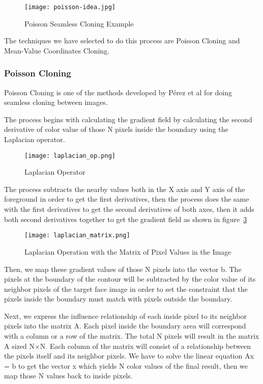 \begin{figure}[htb]
   \centering
   \texttt{[image: poisson-idea.jpg]}
   \caption{Poisson Seamless Cloning Example}
   \label{fig:PoissonIdea}
\end{figure}

The techniques we have selected to do this process are Poisson Cloning and Mean-Value Coordinates Cloning.

\subsubsection{Poisson Cloning}
\hspace{0.5in}Poisson Cloning is one of the methods developed by P\'{e}rez et al\cite{Perez2003} for doing seamless cloning between images.

The process begins with calculating the gradient field by calculating the second derivative of color value of those N pixels inside the boundary using the Laplacian operator.

\begin{figure}[htb]
   \centering
   \texttt{[image: laplacian\_op.png]}
   \caption{Laplacian Operator}
   \label{fig:LaplacianOperator}
\end{figure}

The process subtracts the nearby values both in the X axis and Y axis of the foreground in order to get the first derivatives, then the process does the same with the first derivatives to get the second derivatives of both axes, then it adds both second derivatives together to get the gradient field as shown in figure~\ref{fig:LaplacianMatrix}

\begin{figure}[htb]
   \centering
   \texttt{[image: laplacian\_matrix.png]}
   \caption{Laplacian Operation with the Matrix of Pixel Values in the Image}
   \label{fig:LaplacianMatrix}
\end{figure}

Then, we map these gradient values of those N pixels into the vector b. The pixels at the boundary of the contour will be subtracted by the color value of its neighbor pixels of the target face image in order to set the constraint that the pixels inside the boundary must match with pixels outside the boundary.

Next, we express the influence relationship of each inside pixel to its neighbor pixels into the matrix A. Each pixel inside the boundary area will correspond with a column or a row of the matrix. The total N pixels will result in the matrix A sized N${\times}$N. Each column of the matrix will consist of a relationship between the pixels itself and its neighbor pixels. We have to solve the linear equation Ax = b to get the vector x which yields N color values of the final result, then we map those N values back to inside pixels.

